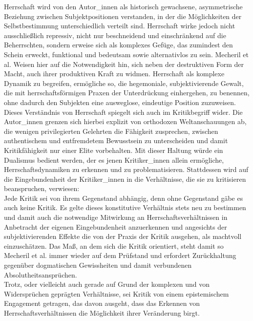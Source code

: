 Herrschaft wird von den Autor\_innen als historisch gewachsene,
asymmetrische Beziehung zwischen Subjektpositionen verstanden, in der die
Möglichkeiten der Selbstbestimmung unterschiedlich verteilt sind. Herrschaft
wirke jedoch nicht ausschließlich repressiv, nicht nur beschneidend und
einschränkend auf die Beherrschten, sondern erweise sich als komplexes Gefüge,
das zumindest den Schein erweckt, \glqq funktional und bedeutsam \grqq \footnotemark {} sowie
alternativlos zu sein. Mecheril et al. Weisen hier auf die Notwendigkeit hin,
sich neben der destruktiven Form der Macht, auch ihrer produktiven Kraft zu
widmen. Herrschaft als komplexe Dynamik zu begreifen, ermögliche so, die
hegemoniale, subjektivierende Gewalt, die mit herrschaftsförmigen Praxen der
Unterdrückung einhergehen, zu benennen, ohne dadurch den Subjekten eine
ausweglose, eindeutige Position zuzuweisen.\footnotemark {}\\
Dieses Verständnis von Herrschaft
spiegelt sich auch im Kritikbegriff wider. Die Autor\_innen grenzen sich hierbei
explizit von orthodoxen Weltanschauungen ab, die wenigen privilegierten
Gelehrten die Fähigkeit zusprechen, zwischen authentischem und entfremdetem
Bewusstsein zu unterscheiden und damit Kritikfähigkeit nur einer Elite
vorbehalten. Mit dieser Haltung würde ein Dualismus bedient werden, der es
jenen Kritiker\_innen allein ermögliche, Herrschaftsdynamiken zu erkennen und zu
problematisieren. \footnotemark {} 
Stattdessen wird auf die Eingebundenheit der Kritiker\_innen
in die Verhältnisse, die sie zu kritisieren beanspruchen, verwiesen:\\
Jede
Kritik sei von ihrem Gegenstand abhängig, denn ohne Gegenstand gäbe es auch
keine Kritik. Es gelte dieses konstitutive Verhältnis stets neu zu bestimmen
und damit auch die notwendige Mitwirkung an Herrschaftsverhältnissen in
Anbetracht der eigenen Eingebundenheit anzuerkennen und angesichts der
\glqq subjektivierenden Effekte\grqq\footnotemark {} die von der Praxis der Kritik ausgehen, als
machtvoll einzuschätzen. Das Maß, an dem sich die Kritik orientiert, steht
damit so Mecheril et al. immer wieder auf dem Prüfstand und erfordert
Zurückhaltung gegenüber dogmatischen Gewissheiten und damit verbundenen
Absolutheitsansprüchen.\footnotemark {} \\
Trotz, oder vielleicht auch gerade auf Grund der
komplexen und von Widersprüchen geprägten Verhältnisse, sei Kritik von einem
epistemischem Engagement getragen, das davon ausgeht, dass das Erkennen von
Herrschaftsverhältnissen die Möglichkeit ihrer Veränderung birgt.\footnotemark
{}\\

